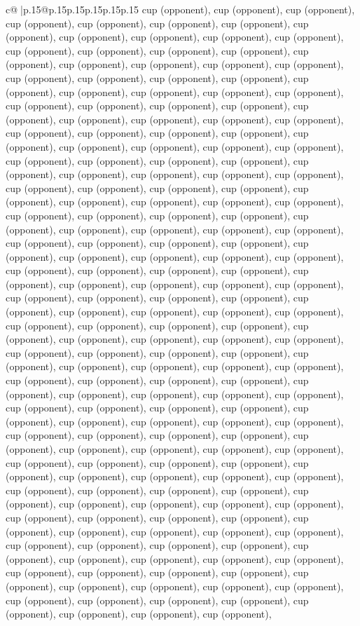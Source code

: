\documentclass{article}
\begin{document}
{\begin{supertabular}{c@{$\;$}|p{.15\linewidth}@{}p{.15\linewidth}p{.15\linewidth}p{.15\linewidth}p{.15\linewidth}p{.15\linewidth}}
{{{cup (opponent), cup (opponent), cup (opponent), cup (opponent), cup (opponent), cup (opponent), cup (opponent), cup (opponent), cup (opponent), cup (opponent), cup (opponent), cup (opponent), cup (opponent), cup (opponent), cup (opponent), cup (opponent), cup (opponent), cup (opponent), cup (opponent), cup (opponent), cup (opponent), cup (opponent), cup (opponent), cup (opponent), cup (opponent), cup (opponent), cup (opponent), cup (opponent), cup (opponent), cup (opponent), cup (opponent), cup (opponent), cup (opponent), cup (opponent), cup (opponent), cup (opponent), cup (opponent), cup (opponent), cup (opponent), cup (opponent), cup (opponent), cup (opponent), cup (opponent), cup (opponent), cup (opponent), cup (opponent), cup (opponent), cup (opponent), cup (opponent), cup (opponent), cup (opponent), cup (opponent), cup (opponent), cup (opponent), cup (opponent), cup (opponent), cup (opponent), cup (opponent), cup (opponent), cup (opponent), cup (opponent), cup (opponent), cup (opponent), cup (opponent), cup (opponent), cup (opponent), cup (opponent), cup (opponent), cup (opponent), cup (opponent), cup (opponent), cup (opponent), cup (opponent), cup (opponent), cup (opponent), cup (opponent), cup (opponent), cup (opponent), cup (opponent), cup (opponent), cup (opponent), cup (opponent), cup (opponent), cup (opponent), cup (opponent), cup (opponent), cup (opponent), cup (opponent), cup (opponent), cup (opponent), cup (opponent), cup (opponent), cup (opponent), cup (opponent), cup (opponent), cup (opponent), cup (opponent), cup (opponent), cup (opponent), cup (opponent), cup (opponent), cup (opponent), cup (opponent), cup (opponent), cup (opponent), cup (opponent), cup (opponent), cup (opponent), cup (opponent), cup (opponent), cup (opponent), cup (opponent), cup (opponent), cup (opponent), cup (opponent), cup (opponent), cup (opponent), cup (opponent), cup (opponent), cup (opponent), cup (opponent), cup (opponent), cup (opponent), cup (opponent), cup (opponent), cup (opponent), cup (opponent), cup (opponent), cup (opponent), cup (opponent), cup (opponent), cup (opponent), cup (opponent), cup (opponent), cup (opponent), cup (opponent), cup (opponent), cup (opponent), cup (opponent), cup (opponent), cup (opponent), cup (opponent), cup (opponent), cup (opponent), cup (opponent), cup (opponent), cup (opponent), cup (opponent), cup (opponent), cup (opponent), cup (opponent), cup (opponent), cup (opponent), cup (opponent), cup (opponent), cup (opponent), cup (opponent), cup (opponent), cup (opponent), cup (opponent), cup (opponent), cup (opponent), cup (opponent), cup (opponent), cup (opponent), cup (opponent), cup (opponent), cup (opponent), cup (opponent), cup (opponent), cup (opponent), cup (opponent), cup (opponent), cup (opponent), cup (opponent), cup (opponent), cup (opponent), cup (opponent), cup (opponent), cup (opponent), cup (opponent), cup (opponent), cup (opponent), cup (opponent), cup (opponent), cup (opponent), cup (opponent), cup (opponent), cup (opponent), cup (opponent), cup (opponent), cup (opponent), cup (opponent), cup (opponent), cup (opponent), cup (opponent), cup (opponent), cup (opponent), cup (opponent), cup (opponent), }}}
\end{supertabular}}
\end{document}
